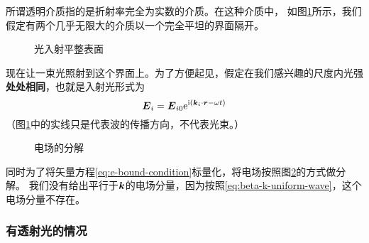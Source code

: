 \documentclass[UTF8, a4paper]{ctexart}
\newcommand*{\ii}{\mathrm{i}}
\newcommand*{\ee}{\mathrm{e}}
\begin{document}
所谓透明介质指的是折射率完全为实数的介质。在这种介质中，
如图\ref{fig:ray-onto-flat-surface}所示，我们假定有两个几乎无限大的介质以一个完全平坦的界面隔开。
\begin{figure}
    \centering
    \caption{光入射平整表面}
    \label{fig:ray-onto-flat-surface}
\end{figure}
现在让一束光照射到这个界面上。为了方便起见，假定在我们感兴趣的尺度内光强\textbf{处处相同}，也就是入射光形式为
\[
    \vb*{E}_i = \vb*{E}_{i0} \ee^{\ii(\vb*{k}_i \cdot \vb*{r} - \omega t)}
\]
（图\ref{fig:ray-onto-flat-surface}中的实线只是代表波的传播方向，不代表光束。）

\begin{figure}
    \centering
    \caption{电场的分解}
    \label{fig:decomposition-of-e}
\end{figure}

同时为了将矢量方程\eqref{eq:e-bound-condition}标量化，将电场按照图\ref{fig:decomposition-of-e}的方式做分解。
我们没有给出平行于$\vb*{k}$的电场分量，因为按照\eqref{eq:beta-k-uniform-wave}，这个电场分量不存在。

\subsubsection{有透射光的情况}
\end{document}
